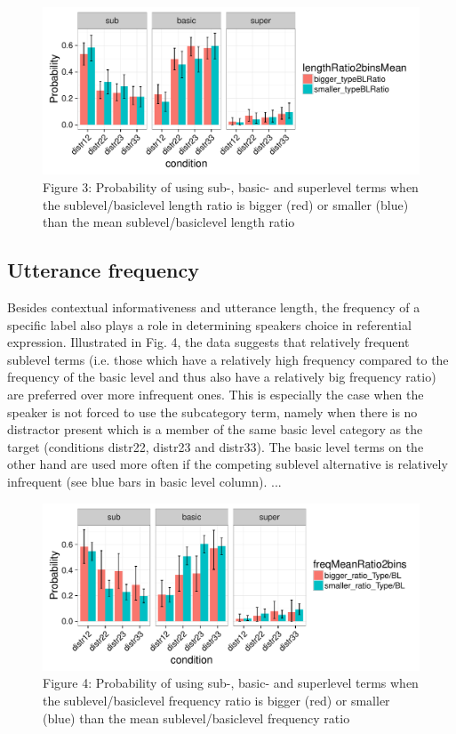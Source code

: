 \documentclass[10pt,letterpaper]{article}
\begin{document}
\begin{figure}[ht!]
\centering
\includegraphics[width=.5\textwidth]{graphs/lengthRatio}
\caption{Figure 3: Probability of using sub-, basic- and superlevel terms when the sublevel/basiclevel length ratio is bigger (red) or smaller (blue) than the mean  sublevel/basiclevel length ratio \label{overflow}}
\end{figure}

\subsection{\bf Utterance frequency}
Besides contextual informativeness and utterance length, the frequency of a specific label also plays a role in determining speakers choice in referential expression. Illustrated in Fig. 4, the data suggests that relatively frequent sublevel terms (i.e. those which have a relatively high frequency compared to the frequency of the basic level and thus also have a relatively big frequency ratio) are preferred over more infrequent ones. This is especially the case when the speaker is not forced to use the subcategory term, namely when there is no distractor present which is a member of the same basic level category as the target (conditions distr22, distr23 and distr33). The basic level terms on the other hand are used more often if the competing sublevel alternative is relatively infrequent (see blue bars in basic level column). ...

\begin{figure}[ht!]
\centering
\includegraphics[width=.5\textwidth]{graphs/frequencyRatio}
\caption{Figure 4: Probability of using sub-, basic- and superlevel terms when the sublevel/basiclevel frequency ratio is bigger (red) or smaller (blue) than the mean  sublevel/basiclevel frequency ratio \label{overflow}}
\end{figure}
\end{document}
